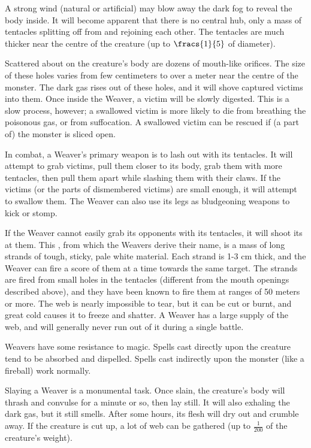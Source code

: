 A strong wind (natural or artificial) may blow away the dark fog to reveal the body inside. It will become apparent that there is no central hub, only a mass of tentacles splitting off from and rejoining each other. The tentacles are much thicker near the centre of the creature (up to $\fracs{1}{5}$ of diameter). 

Scattered about on the creature's body are dozens of mouth-like orifices. The size of these holes varies from few centimeters to over a meter near the centre of the monster. The dark gas rises out of these holes, and it will shove captured victims into them. Once inside the Weaver, a victim will be slowly digested. This is a slow process, however; a swallowed victim is more likely to die from breathing the poisonous gas, or from suffocation. A swallowed victim can be rescued if (a part of) the monster is sliced open. 

In combat, a Weaver's primary weapon is to lash out with its tentacles. It will attempt to grab victims, pull them closer to its body, grab them with more tentacles, then pull them apart while slashing them with their claws. If the victims (or the parts of dismembered victims) are small enough, it will attempt to swallow them. The Weaver can also use its legs as bludgeoning weapons to kick or stomp. 

If the Weaver cannot easily grab its opponents with its tentacles, it will shoot its  at them. This , from which the Weavers derive their name, is a mass of long strands of tough, sticky, pale white material. Each strand is 1-3 cm thick, and the Weaver can fire a score of them at a time towards the same target. The strands are fired from small holes in the tentacles (different from the mouth openings described above), and they have been known to fire them at ranges of 50 meters or more. The web is nearly impossible to tear, but it can be cut or burnt, and great cold causes it to freeze and shatter. A Weaver has a large supply of the web, and will generally never run out of it during a single battle. 

Weavers have some resistance to magic. Spells cast directly upon the creature tend to be absorbed and dispelled. Spells cast indirectly upon the monster (like a fireball) work normally. 

Slaying a Weaver is a monumental task. Once slain, the creature's body will thrash and convulse for a minute or so, then lay still. It will also exhaling the dark gas, but it still smells. After some hours, its flesh will dry out and crumble away. If the creature is cut up, a lot of web can be gathered (up to $\frac{1}{200}$ of the creature's weight). 


